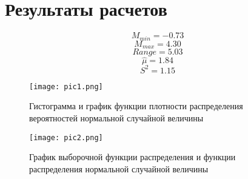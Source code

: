 \chapter{Результаты расчетов}

$$M_{min} = -0.73$$
$$M_{max} = 4.30$$
$$Range = 5.03$$
$$\hat{\mu} = 1.84$$
$$S^2 = 1.15$$

\begin{figure}[h]
  \centering
  \texttt{[image: pic1.png]}
  \caption{Гистограмма и график функции плотности распределения вероятностей нормальной случайной величины}
\end{figure}

\begin{figure}[h]
  \centering
  \texttt{[image: pic2.png]}
  \caption{График выборочной функции распределения и функции распределения нормальной случайной величины}
\end{figure}